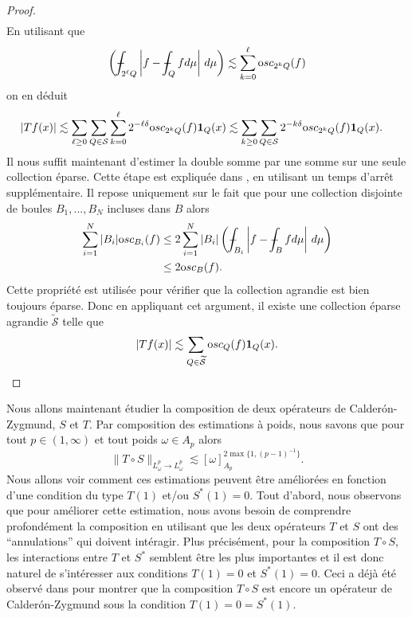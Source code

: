 \documentclass[11pt]{amsart}
\newcommand{\osc}{{\textrm osc}}
\newcommand{\mcS}{{\mathcal S}}
\def\Xint#1{\mathchoice
   {\XXint\displaystyle\textstyle{#1}}%
   {\XXint\textstyle\scriptstyle{#1}}%
   {\XXint\scriptstyle\scriptscriptstyle{#1}}%
   {\XXint\scriptscriptstyle\scriptscriptstyle{#1}}%
   \!\int}
\def\XXint#1#2#3{{\setbox0=\hbox{$#1{#2#3}{\int}$}
     \vcenter{\hbox{$#2#3$}}\kern-.5\wd0}}
\def\aver#1{\Xint-_{#1}}
\begin{document}
\begin{proof}
\begin{align*}
\end{align*}
En utilisant que 
$$ \left(\aver{2^\ell Q} \left|f - \aver{Q}f d\mu \right|\, d\mu\right) \lesssim \sum_{k=0}^\ell \osc_{2^k Q}(f)$$
on en d\'eduit
\begin{align*}
\left|Tf(x)\right| & \lesssim \sum_{\ell \geq 0} \sum_{Q\in \mcS}  \sum_{k=0}^\ell 2^{-\ell \delta} \osc_{2^k Q}(f)  {\bf 1}_Q(x) \lesssim \sum_{k\geq 0} \sum_{Q\in \mcS}  2^{-k \delta} \osc_{2^k Q}(f) {\bf 1}_Q(x).
\end{align*}
Il nous suffit maintenant d'estimer la double somme par une somme sur une seule collection \'eparse. Cette \'etape est expliqu\'ee dans \cite[Sections 12-13]{LernerNazarov}, en utilisant un temps d'arr\^et suppl\'ementaire. Il repose uniquement sur le fait que pour une collection disjointe de boules $B_1,...,B_N$ incluses dans $B$ alors
\begin{align*}  
\sum_{i=1}^N |B_i| \osc_{B_i}(f) & \leq  2 \sum_{i=1}^N |B_i| \left(\aver{B_i} \left|f - \aver{B}f d\mu \right|\, d\mu\right) \\
& \leq 2 \osc_{B}(f).
\end{align*}
Cette propri\'et\'e est utilis\'ee pour v\'erifier que la collection agrandie est bien toujours \'eparse. Donc en appliquant cet argument, il existe une collection \'eparse agrandie
$\widetilde \mcS$ telle que
\begin{align*}
\left|Tf(x)\right| \lesssim  \sum_{Q\in \widetilde \mcS}  \osc_{Q}(f) {\bf 1}_Q(x).
\end{align*}
\end{proof}


Nous allons maintenant \'etudier la composition de deux op\'erateurs de Calder\'on-Zygmund, $S$ et $T$. Par composition des estimations \`a poids, nous savons que pour tout $p\in(1,\infty)$ et tout poids $\omega \in A_p$ alors
$$ \|T\circ S \|_{L^p_\omega \to L^p_\omega} \lesssim [\omega]_{A_p}^{2\max\{1, (p-1)^{-1}\}}.$$
Nous allons voir comment ces estimations peuvent \^etre am\'elior\'ees en fonction d'une condition du type $T(1)$ et/ou $S^* (1)=0$. Tout d'abord, nous observons que pour am\'eliorer cette estimation, nous avons besoin de comprendre profond\'ement la composition en utilisant que les deux op\'erateurs $T$ et $S$ ont des ``annulations'' qui doivent int\'eragir. Plus pr\'ecis\'ement, pour la composition $T \circ S$, les interactions entre $T$ et $S^*$ semblent \^etre les plus importantes et il est donc naturel de s'int\'eresser aux conditions $T(1)=0$ et $S^* (1)=0$. Ceci a d\'ej\`a \'et\'e observ\'e dans \cite[Section 9]{CoifMeyer-ondelettes} pour montrer que la composition $T\circ S$ est encore un op\'erateur de Calder\'on-Zygmund sous la condition $T(1)=0=S^*(1)$.
\end{document}

